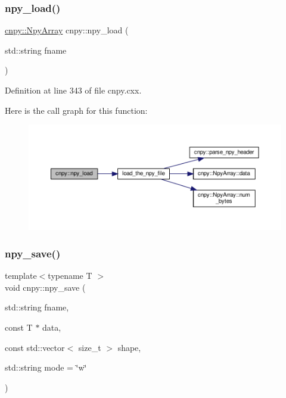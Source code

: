 \subsubsection{\texorpdfstring{npy\+\_\+load()}{npy\_load()}}
{\footnotesize\ttfamily \hyperlink{structcnpy_1_1_npy_array}{cnpy\+::\+Npy\+Array} cnpy\+::npy\+\_\+load (\begin{DoxyParamCaption}\item[{std\+::string}]{fname }\end{DoxyParamCaption})}



Definition at line 343 of file cnpy.\+cxx.

Here is the call graph for this function\+:
\nopagebreak
\begin{figure}[H]
\begin{center}
\leavevmode
\includegraphics[width=350pt]{namespacecnpy_abffb25587a54473fbe1d3c86fa4df4fb_cgraph}
\end{center}
\end{figure}
\mbox{\label{namespacecnpy_abd95249bf67216d36416294df339fb47}} 
\subsubsection{\texorpdfstring{npy\+\_\+save()}{npy\_save()}\hspace{0.1cm}{\footnotesize\ttfamily [1/2]}}
{\footnotesize\ttfamily template$<$typename T $>$ \\
void cnpy\+::npy\+\_\+save (\begin{DoxyParamCaption}\item[{std\+::string}]{fname,  }\item[{const T $\ast$}]{data,  }\item[{const std\+::vector$<$ size\+\_\+t $>$}]{shape,  }\item[{std\+::string}]{mode = {\ttfamily \char`\"{}w\char`\"{}} }\end{DoxyParamCaption})}



